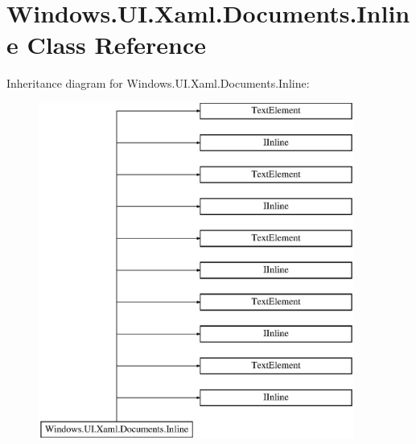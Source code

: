 \hypertarget{class_windows_1_1_u_i_1_1_xaml_1_1_documents_1_1_inline}{}\section{Windows.\+U\+I.\+Xaml.\+Documents.\+Inline Class Reference}
\label{class_windows_1_1_u_i_1_1_xaml_1_1_documents_1_1_inline}
Inheritance diagram for Windows.\+U\+I.\+Xaml.\+Documents.\+Inline\+:\begin{figure}[H]
\begin{center}
\leavevmode
\includegraphics[height=11.000000cm]{class_windows_1_1_u_i_1_1_xaml_1_1_documents_1_1_inline}
\end{center}
\end{figure}

